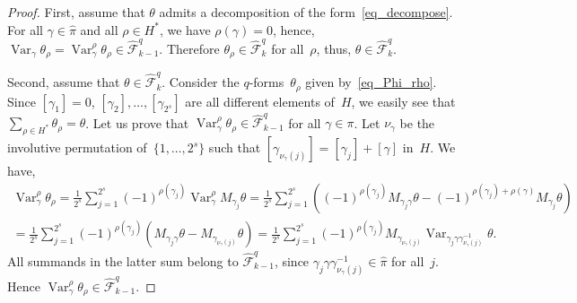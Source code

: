 \documentclass[reqno,tbtags,12pt]{amsart}
\numberwithin{equation}{section}
\newcommand{\hpi}{\hat{\pi}}
\newcommand{\hCF}{\widehat{\mathcal{F}}}
\newcommand{\Var}{\mathop{\mathrm{Var}}\nolimits}
\theoremstyle{definition}
\begin{document}
\begin{proof}
First, assume that $\theta$ admits a decomposition of the form~\eqref{eq_decompose}. For all $\gamma\in\hpi$ and all $\rho\in H^*$, we have $\rho(\gamma)=0$, hence, $\Var_{\gamma}\theta_{\rho}=\Var^{\rho}_{\gamma}\theta_{\rho}\in \hCF_{k-1}^q$. Therefore $\theta_{\rho}\in\hCF_{k}^q$ for all~$\rho$, thus, $\theta\in\hCF_{k}^q$.

Second, assume that $\theta\in\hCF_{k}^q$. Consider the $q$-forms~$\theta_{\rho}$ given by~\eqref{eq_Phi_rho}.
Since $[\gamma_1]=0$, $[\gamma_2],\ldots,[\gamma_{2^s}]$ are all different elements of~$H$, we easily see that
$\sum_{\rho\in H^*}\theta_{\rho}=\theta$. 
Let us prove that $\Var_{\gamma}^{\rho}\theta_{\rho}\in\hCF_{k-1}^q$ for all $\gamma\in \pi$. Let $\nu_{\gamma}$ be the involutive permutation of~$\{1,\ldots,2^s\}$ such that $[\gamma_{\nu_{\gamma}(j)}]=[\gamma_j]+[\gamma]$ in~$H$. We have,
\begin{multline*}
\Var_{\gamma}^{\rho}\theta_{\rho}=\frac{1}{2^s}\sum_{j=1}^{2^s}(-1)^{\rho(\gamma_j)}\Var_{\gamma}^{\rho}M_{\gamma_j}\theta=
\frac{1}{2^s}\sum_{j=1}^{2^s}\left((-1)^{\rho(\gamma_j)}M_{\gamma_j\gamma}\theta
-(-1)^{\rho(\gamma_j)+\rho(\gamma)}M_{\gamma_j}\theta\right)\\
{}=\frac{1}{2^s}\sum_{j=1}^{2^s}(-1)^{\rho(\gamma_j)}\left(M_{\gamma_{j}\gamma}\theta
-M_{\gamma_{\nu_{\gamma}(j)}}\theta\right)=\frac{1}{2^s}\sum_{j=1}^{2^s}(-1)^{\rho(\gamma_j)}M_{\gamma_{\nu_{\gamma}(j)}}\Var_{\gamma_{j}\gamma\gamma_{\nu_{\gamma}(j)}^{-1}}\theta.
\end{multline*}
All summands in the latter sum belong to $\hCF_{k-1}^q$, since $\gamma_{j}\gamma\gamma_{\nu_{\gamma}(j)}^{-1}\in\hpi$ for all~$j$. Hence $\Var_{\gamma}^{\rho}\theta_{\rho}\in\hCF_{k-1}^q$.
\end{proof}
\end{document}
